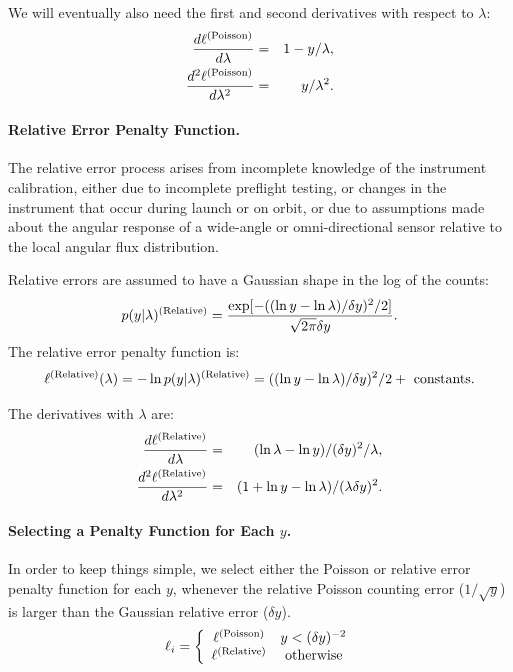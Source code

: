 \documentclass{article}    %
\newcommand{\subsubsubsection}[1]{\paragraph{#1.}}
\begin{document}
We will eventually also need the first and second derivatives with respect to $\lambda$:
\begin{eqnarray}
\frac{d \ell^{\rm (Poisson)}}{d \lambda} &=& 1-y/\lambda, \\
\frac{d^2 \ell^{\rm (Poisson)}}{d \lambda^2} &=& y/\lambda^2.
\end{eqnarray}

\subsubsubsection{Relative Error Penalty Function}

The relative error process arises from incomplete knowledge of the
instrument calibration, either due to incomplete preflight testing, or
changes in the instrument that occur during launch or on orbit, or due
to assumptions made about the angular response of a wide-angle or
omni-directional sensor relative to the local angular flux
distribution.

Relative errors are assumed to have a Gaussian shape in the
log of the counts:
\begin{equation}
p(y|\lambda)^{\rm (Relative)} = \frac{\exp[ -((\ln y-\ln\lambda)/\delta y)^2/2 ]}{\sqrt{2\pi}\delta y}.
\end{equation}
The relative error penalty function is:
\begin{equation}
\ell^{\rm (Relative)}(\lambda) = -\ln p(y|\lambda)^{\rm (Relative)} = ((\ln y-\ln\lambda)/\delta y)^2/2 + {\rm ~ constants}.
\end{equation}

The derivatives with $\lambda$ are:
\begin{eqnarray}
\frac{d \ell^{\rm (Relative)}}{d \lambda} &=& (\ln\lambda-\ln y)/(\delta y)^2/\lambda, \\
\frac{d^2 \ell^{\rm (Relative)}}{d \lambda^2} &=& (1+\ln y - \ln \lambda)/(\lambda\delta y)^2.
\end{eqnarray}

\subsubsubsection{Selecting a Penalty Function for Each $y$}

In order to keep things simple, we select either the Poisson or
relative error penalty function for each $y$, whenever the relative
Poisson counting error ($1/\sqrt{y}$) is larger than the Gaussian
relative error ($\delta y$).
\begin{equation}
\ell_i = \left\{
\begin{array}{cl}
\ell^{\rm (Poisson)} & y < (\delta y)^{-2} \\
\ell^{\rm (Relative)} & {\rm ~ otherwise}
\end{array}
\right.
\end{equation}
\end{document}
